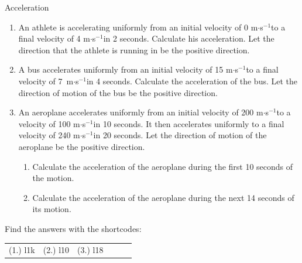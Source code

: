     \noindent
\label{m38794*notfhsst!!!underscore!!!id1812}
	\par
\label{m38794*secfhsst!!!underscore!!!id1815}
\begin{exercises}{Acceleration }
            \nopagebreak
      \label{m38794*id62523}\begin{enumerate}[noitemsep, label=\textbf{\arabic*}. ] 
            \label{m38794*uid78}\item An athlete is accelerating uniformly from an initial velocity of 0 m$\ensuremath{\cdot}$s${}^{-1}$to a final velocity of 4 m$\ensuremath{\cdot}$s${}^{-1}$in 2 seconds. Calculate his acceleration. Let the direction that the athlete is running in be the positive direction.\newline
\label{m38794*uid79}\item A bus accelerates uniformly from an initial velocity of 15 m$\ensuremath{\cdot}$s${}^{-1}$to a final velocity of 7~m$\ensuremath{\cdot}$s${}^{-1}$in 4 seconds. Calculate the acceleration of the bus. Let the direction of motion of the bus be the positive direction.\newline
\label{m38794*uid80}\item An aeroplane accelerates uniformly from an initial velocity of 200 m$\ensuremath{\cdot}$s${}^{-1}$to a velocity of 100 m$\ensuremath{\cdot}$s${}^{-1}$in 10 seconds. It then accelerates uniformly to a final velocity of 240 m$\ensuremath{\cdot}$s${}^{-1}$in 20 seconds. Let the direction of motion of the aeroplane be the positive direction.
\label{m38794*id68889}\begin{enumerate}[noitemsep, label=\textbf{\alph*}. ] 
            \label{m38794*uid81}\item Calculate the acceleration of the aeroplane during the first 10 seconds of the motion.
\label{m38794*uid82}\item Calculate the acceleration of the aeroplane during the next 14 seconds of its motion.
\end{enumerate}
                \end{enumerate}
  \label{m38794**end}
\par {} Find the answers with the shortcodes:
 \par \begin{tabular}[h]{cccccc}
 (1.) l1k  &  (2.) l10  &  (3.) l18  & \end{tabular}
\end{exercises}
